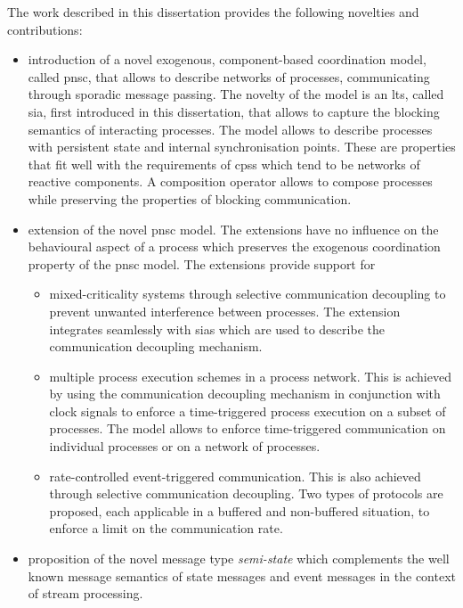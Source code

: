 The work described in this dissertation provides the following novelties and contributions:
\begin{itemize}
    \item introduction of a novel exogenous, component-based coordination model, called \gls{pnsc}, that allows to describe networks of processes, communicating through sporadic message passing.
        The novelty of the model is an \gls{lts}, called \gls{sia}, first introduced in this dissertation, that allows to capture the blocking semantics of interacting processes.
        The model allows to describe processes with persistent state and internal synchronisation points.
        These are properties that fit well with the requirements of \glspl{cps} which tend to be networks of reactive components.
        A composition operator allows to compose processes while preserving the properties of blocking communication.
    \item extension of the novel \gls{pnsc} model.
        The extensions have no influence on the behavioural aspect of a process which preserves the exogenous coordination property of the \gls{pnsc} model.
        The extensions provide support for
        \begin{itemize}
            \item mixed-criticality systems through selective communication decoupling to prevent unwanted interference between processes.
                The extension integrates seamlessly with \glspl{sia} which are used to describe the communication decoupling mechanism.
            \item multiple process execution schemes in a process network.
                This is achieved by using the communication decoupling mechanism in conjunction with clock signals to enforce a time-triggered process execution on a subset of processes.
                The model allows to enforce time-triggered communication on individual processes or on a network of processes.
            \item rate-controlled event-triggered communication.
                This is also achieved through selective communication decoupling.
                Two types of protocols are proposed, each applicable in a buffered and non-buffered situation, to enforce a limit on the communication rate.
        \end{itemize}
    \item proposition of the novel message type \emph{semi-state} which complements the well known message semantics of state messages and event messages in the context of stream processing.

\end{itemize}
